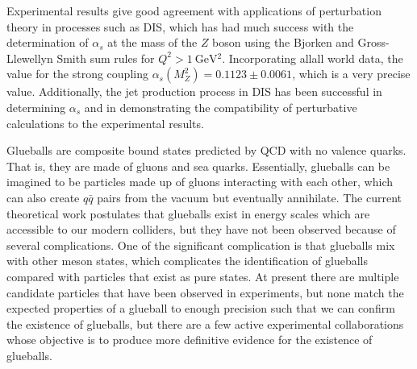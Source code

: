 Experimental results give good agreement with applications of perturbation theory in processes such as DIS, which has had much success with the determination of $\alpha_{s}$ at the mass of the $Z$ boson using the Bjorken and Gross-Llewellyn Smith sum rules for $Q^2 > \SI{1}{\GeV^2}$.
Incorporating allall  world data, the value for the strong coupling $\alpha_s(M_{Z}^2) = 0.1123 \pm 0.0061$, which is a very precise value.
Additionally, the jet production process in DIS has been successful in determining $\alpha_{s}$ and in demonstrating the compatibility of perturbative calculations to the experimental results.


Glueballs are composite bound states predicted by QCD with no valence quarks.
That is, they are made of gluons and sea quarks.
Essentially, glueballs can be imagined to be particles made up of gluons interacting with each other, which can also create $q\bar{q}$ pairs from the vacuum but eventually annihilate.
The current theoretical work postulates that glueballs exist in energy scales which are accessible to our modern colliders, but they have not been observed because of several complications.
One of the significant complication is that glueballs mix with other meson states, which complicates the identification of glueballs compared with particles that exist as pure states.
At present there are multiple candidate particles that have been observed in experiments, but none match the expected properties of a glueball to enough precision such that we can confirm the existence of glueballs, but there are a few active experimental collaborations whose objective is to produce more definitive evidence for the existence of glueballs.



